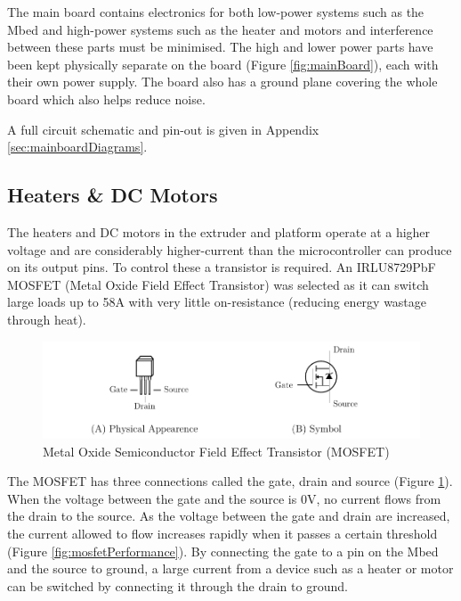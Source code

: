 			The main board contains electronics for both low-power systems such as
			the Mbed and high-power systems such as the heater and motors and
			interference between these parts must be minimised. The high and lower
			power parts have been kept physically separate on the board (Figure
			\ref{fig:mainBoard}), each with their own power supply. The board also
			has a ground plane covering the whole board which also helps reduce
			noise\cite{pcb_design_notes}.
			
			A full circuit schematic and pin-out is given in Appendix
			\ref{sec:mainboardDiagrams}.
		
		\subsection{Heaters \& DC Motors}
			
			\label{sec:heatersAndMotors}
			
			
			The heaters and DC motors in the extruder and platform operate at a
			higher voltage and are considerably higher-current than the
			microcontroller can produce on its output pins. To control these a
			transistor is required.  An IRLU8729PbF MOSFET (Metal Oxide Field Effect
			Transistor) was selected as it can switch large loads up to 58A with
			very little on-resistance (reducing energy wastage through
			heat)\cite{MOSFET}.
			
			\begin{figure}
				\includegraphics[width=1\textwidth]{diagrams/mosfetDiagram.pdf}
				\caption{Metal Oxide Semiconductor Field Effect Transistor (MOSFET)}
				\label{fig:mosfetDiagram}
			\end{figure}
			
			The MOSFET has three connections called the gate, drain and source
			(Figure \ref{fig:mosfetDiagram}). When the voltage between the gate and
			the source is 0V, no current flows from the drain to the source. As the
			voltage between the gate and drain are increased, the current allowed to
			flow increases rapidly when it passes a certain threshold (Figure
			\ref{fig:mosfetPerformance}). By connecting the gate to a pin on the
			Mbed and the source to ground, a large current from a device such as a
			heater or motor can be switched by connecting it through the drain to
			ground.
			
